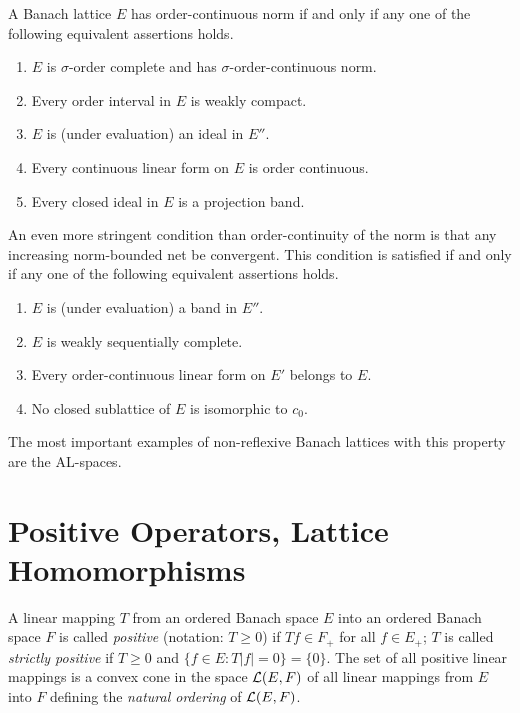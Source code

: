 A Banach lattice $ E $ has order-continuous norm if and only if any one of the following equivalent assertions holds.
\begin{enumerate}[\upshape (a)]
	\item 
	$ E $ is $ \sigma $-order complete and has $ \sigma $-order-continuous norm.

	\item 
	Every order interval in $ E $ is weakly compact.

	\item 
	$ E $ is (under evaluation) an ideal in $ E'' $.

	\item 
	Every continuous linear form on $ E $ is order continuous.

	\item 
	Every closed ideal in $ E $ is a projection band.

\end{enumerate}
An even more stringent condition than order-continuity of the norm is that any increasing norm-bounded net be convergent.
This condition is satisfied if and only if any one of the following equivalent assertions holds.
\begin{enumerate}[\upshape (a)]

    \item 
    $ E $ is (under evaluation) a band in $ E'' $.
    
    \item 
    $ E $ is weakly sequentially complete.
    
    \item 
    Every order-continuous linear form on $ E' $ belongs to $ E $.
    
    \item 
    No closed sublattice of\/ $ E $ is isomorphic to $ c_{0} $.

\end{enumerate}
The most important examples of non-reflexive Banach lattices with this property are the AL-spaces.
\section{Positive Operators, Lattice Homomorphisms}\label{sec:c1-6}%
%
%
%
A linear mapping $ T $ from an ordered Banach space $ E $ into an ordered Banach space $ F $ is called \emph{positive} (notation: $ T \geq 0 $) if\/ $ Tf \in F_{+} $ for all $ f \in E_{+} $; $ T $ is called \emph{strictly positive} if\/ $ T \geq 0 $ and $ \{f \in E \colon T|f| = 0\} = \{0\} $.
The set of all positive linear mappings is a convex cone in the space $ \mathcal{L}(E,F) $ of all linear mappings from $ E $ into $ F $ defining the \emph{natural ordering} of\/ $ \mathcal{L}(E,F) $.

